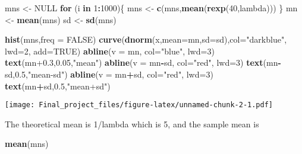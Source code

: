 \documentclass[
]{article}
\newenvironment{Shaded}{\begin{snugshade}}{\end{snugshade}}
\newcommand{\ControlFlowTok}[1]{\textcolor[rgb]{0.13,0.29,0.53}{\textbf{#1}}}
\newcommand{\DataTypeTok}[1]{\textcolor[rgb]{0.13,0.29,0.53}{#1}}
\newcommand{\DecValTok}[1]{\textcolor[rgb]{0.00,0.00,0.81}{#1}}
\newcommand{\FloatTok}[1]{\textcolor[rgb]{0.00,0.00,0.81}{#1}}
\newcommand{\KeywordTok}[1]{\textcolor[rgb]{0.13,0.29,0.53}{\textbf{#1}}}
\newcommand{\NormalTok}[1]{#1}
\newcommand{\OperatorTok}[1]{\textcolor[rgb]{0.81,0.36,0.00}{\textbf{#1}}}
\newcommand{\OtherTok}[1]{\textcolor[rgb]{0.56,0.35,0.01}{#1}}
\newcommand{\StringTok}[1]{\textcolor[rgb]{0.31,0.60,0.02}{#1}}
\begin{document}
\begin{Shaded}
\begin{Highlighting}[]
\NormalTok{    mns <-}\StringTok{ }\OtherTok{NULL}
    \ControlFlowTok{for}\NormalTok{ (i }\ControlFlowTok{in} \DecValTok{1}\OperatorTok{:}\DecValTok{1000}\NormalTok{)\{}
\NormalTok{      mns <-}\StringTok{ }\KeywordTok{c}\NormalTok{(mns,}\KeywordTok{mean}\NormalTok{(}\KeywordTok{rexp}\NormalTok{(}\DecValTok{40}\NormalTok{,lambda)))}
\NormalTok{    \}}
\NormalTok{    mn <-}\StringTok{ }\KeywordTok{mean}\NormalTok{(mns)}
\NormalTok{    sd <-}\StringTok{ }\KeywordTok{sd}\NormalTok{(mns)}
    
    \KeywordTok{hist}\NormalTok{(mns,}\DataTypeTok{freq =} \OtherTok{FALSE}\NormalTok{)}
    \KeywordTok{curve}\NormalTok{(}\KeywordTok{dnorm}\NormalTok{(x,}\DataTypeTok{mean=}\NormalTok{mn,}\DataTypeTok{sd=}\NormalTok{sd),}\DataTypeTok{col=}\StringTok{"darkblue"}\NormalTok{, }\DataTypeTok{lwd=}\DecValTok{2}\NormalTok{, }\DataTypeTok{add=}\OtherTok{TRUE}\NormalTok{)}
    \KeywordTok{abline}\NormalTok{(}\DataTypeTok{v =}\NormalTok{ mn, }\DataTypeTok{col=}\StringTok{"blue"}\NormalTok{, }\DataTypeTok{lwd=}\DecValTok{3}\NormalTok{)}
    \KeywordTok{text}\NormalTok{(mn}\FloatTok{+0.3}\NormalTok{,}\FloatTok{0.05}\NormalTok{,}\StringTok{"mean"}\NormalTok{)}
    \KeywordTok{abline}\NormalTok{(}\DataTypeTok{v =}\NormalTok{ mn}\OperatorTok{-}\NormalTok{sd, }\DataTypeTok{col=}\StringTok{"red"}\NormalTok{, }\DataTypeTok{lwd=}\DecValTok{3}\NormalTok{)}
    \KeywordTok{text}\NormalTok{(mn}\OperatorTok{-}\NormalTok{sd,}\FloatTok{0.5}\NormalTok{,}\StringTok{"mean-sd"}\NormalTok{)}
    \KeywordTok{abline}\NormalTok{(}\DataTypeTok{v =}\NormalTok{ mn}\OperatorTok{+}\NormalTok{sd, }\DataTypeTok{col=}\StringTok{"red"}\NormalTok{, }\DataTypeTok{lwd=}\DecValTok{3}\NormalTok{)}
    \KeywordTok{text}\NormalTok{(mn}\OperatorTok{+}\NormalTok{sd,}\FloatTok{0.5}\NormalTok{,}\StringTok{"mean+sd"}\NormalTok{)}
\end{Highlighting}
\end{Shaded}

\texttt{[image: Final\_project\_files/figure-latex/unnamed-chunk-2-1.pdf]}

The theoretical mean is 1/lambda which is 5, and the sample mean is

\begin{Shaded}
\begin{Highlighting}[]
   \KeywordTok{mean}\NormalTok{(mns)}
\end{Highlighting}
\end{Shaded}
\end{document}
